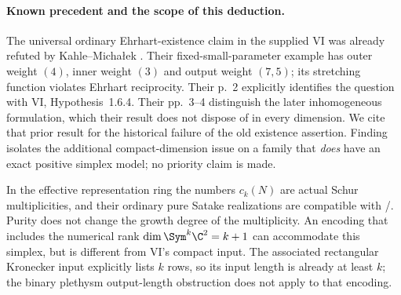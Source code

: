 \paragraph{Known precedent and the scope of this deduction.}
The universal ordinary Ehrhart-existence claim in the supplied VI
was already refuted by Kahle--Micha{\l}ek
\cite[Theorem~5 and Remark~6, p.~4]{KM}.
Their fixed-small-parameter example has outer weight $(4)$, inner
weight $(3)$ and output weight $(7,5)$; its stretching function
violates Ehrhart reciprocity. Their p.~2 explicitly identifies the
question with VI, Hypothesis~1.6.4. Their pp.~3--4 distinguish the
later inhomogeneous formulation, which their result does not
dispose of in every dimension.
We cite that prior result for the historical failure of the old
existence assertion. Finding~ isolates the additional
compact-dimension issue on a family that \emph{does} have an exact
positive simplex model; no priority claim is made.

In the effective representation ring the numbers $c_k(N)$ are actual
Schur multiplicities, and their ordinary pure Satake realizations
are compatible with /. Purity does not change the
growth degree of the multiplicity. An encoding that includes the
numerical rank $\dim\Sym^k\C^2=k+1$ can accommodate this simplex,
but is different from VI's compact input. The associated rectangular
Kronecker input explicitly lists $k$ rows, so its input length is
already at least $k$; the binary plethysm output-length obstruction
does not apply to that encoding.

